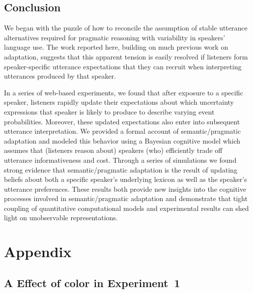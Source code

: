 \documentclass[man, floatsintext]{apa6}
\begin{document}
\subsection{Conclusion}

We began with the puzzle of how to reconcile the assumption of stable utterance alternatives required for pragmatic reasoning with variability in speakers'  language use. The work reported here, building on much previous work on adaptation, suggests that this apparent tension is easily resolved if listeners form speaker-specific utterance expectations that they can recruit when interpreting utterances produced by that speaker.

In a series of web-based experiments, we found that after exposure to a specific speaker, listeners rapidly update 
their expectations about which uncertainty expressions that speaker is likely to produce
to describe varying event probabilities. Moreover, these updated expectations also enter into subsequent utterance interpretation.
We provided a formal account of semantic/pragmatic adaptation and modeled this behavior using a Bayesian cognitive model 
which assumes that (listeners reason about) speakers (who) efficiently trade off utterance informativeness and cost.
Through a series of simulations we found strong evidence that semantic/pragmatic adaptation is the result of
updating beliefs about both a specific speaker's underlying lexicon as well as the speaker's utterance
preferences. These results both provide new insights into the cognitive processes involved in semantic/pragmatic adaptation
and demonstrate that tight coupling of quantitative computational models and experimental results can shed light on
unobservable representations.

\printbibliography

\pagebreak


\section*{Appendix}

\subsection*{A Effect of color in Experiment~1}
\end{document}
